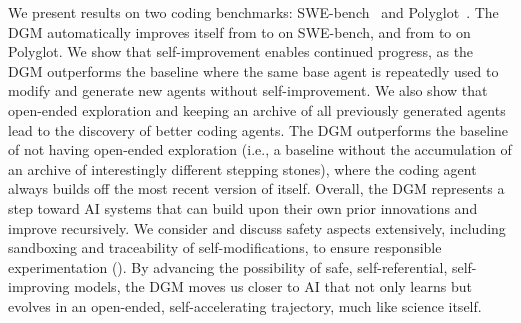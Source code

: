 We present results on two coding benchmarks: SWE-bench~\citep{jimenez2024swebench} and Polyglot~\citep{gauthier2024polyglot}. The DGM automatically improves itself from \DgmSweBenchInitial{} to \DgmSweBenchFinal{} on SWE-bench, and from \DgmPolyglotInitial{} to \DgmPolyglotFinal{} on Polyglot. We show that self-improvement enables continued progress, as the DGM outperforms the baseline where the same base agent is repeatedly used to modify and generate new agents without self-improvement. We also show that open-ended exploration and keeping an archive of all previously generated agents lead to the discovery of better coding agents. The DGM outperforms the baseline of not having open-ended exploration (i.e., a baseline without the accumulation of an archive of interestingly different stepping stones), where the coding agent always builds off the most recent version of itself. Overall, the DGM represents a step toward AI systems that can build upon their own prior innovations and improve recursively. We consider and discuss safety aspects extensively, including sandboxing and traceability of self-modifications, to ensure responsible experimentation (). By advancing the possibility of safe, self-referential, self-improving models, the DGM moves us closer to AI that not only learns but evolves in an open-ended, self-accelerating trajectory, much like science itself.

